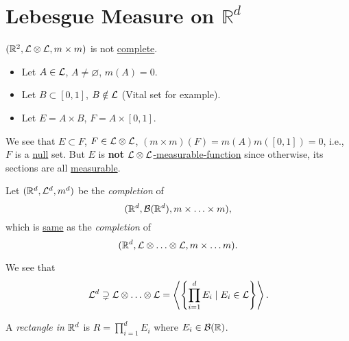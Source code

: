 \section{Lebesgue Measure on \(\mathbb{R} ^d\)}
\begin{eg}
	\((\mathbb{\MakeUppercase{r}} ^{2} , \mathcal{\MakeUppercase{l}} \otimes \mathcal{\MakeUppercase{l}}, m\times m)\) is not
	\hyperref[def:complete-measure-space]{complete}.
\end{eg}
\begin{explanation}
	\begin{itemize}
		\item Let \(A\in \mathcal{\MakeUppercase{l}} \), \(A\neq \varnothing \), \(m(A) = 0\).
		\item Let \(B\subset [0, 1]\), \(B \notin \mathcal{\MakeUppercase{l}} \) (Vital set for example).
		\item Let \(E = A\times B\), \(F = A \times [0, 1]\).
	\end{itemize}
	We see that \(E\subset F\), \(F \in \mathcal{\MakeUppercase{l}} \otimes \mathcal{\MakeUppercase{l}} \), \((m\times m)(F)=m(A)m([0, 1]) = 0\), i.e.,
	\(F\) is a \hyperref[def:mu-null-set]{null} set. But \(E\) is \textbf{not}
	\hyperref[def:A-measurable-function]{\(\mathcal{\MakeUppercase{l}} \otimes \mathcal{\MakeUppercase{l}} \)-measurable-function} since otherwise,
	its sections are all \hyperref[def:A-measurable-function]{measurable}.
\end{explanation}
\begin{definition}
	Let \((\mathbb{\MakeUppercase{r}} ^d, \mathcal{\MakeUppercase{l}} ^d, m^d)\) be the \emph{completion} of
	\[
		(\mathbb{\MakeUppercase{r}} ^d, \mathcal{\MakeUppercase{b}} (\mathbb{\MakeUppercase{r}} ^d), m\times \ldots \times m ),
	\]
	which is \underline{same} as the \emph{completion} of
	\[
		(\mathbb{\MakeUppercase{r}} ^d, \mathcal{\MakeUppercase{l}} \otimes \ldots \otimes \mathcal{\MakeUppercase{l}}, m\times \ldots m).
	\]
\end{definition}

\begin{remark}
	We see that
	\[
		\mathcal{\MakeUppercase{l}} ^d \supsetneq \mathcal{\MakeUppercase{l}} \otimes \ldots \otimes \mathcal{\MakeUppercase{l}}
		= \left< \left\{ \prod\limits_{i=1}^{d}E_{i} \mid E_{i} \in \mathcal{\MakeUppercase{l}}  \right\} \right>.
	\]
\end{remark}

\begin{definition}\label{def:rectangle-in-Rd}
	A \emph{rectangle in \(\mathbb{\MakeUppercase{r}} ^d\)} is \(R = \prod\limits_{i=1}^{d} E_{i} \) where \(E_{i}\in \mathcal{\MakeUppercase{b}} (\mathbb{\MakeUppercase{r}} )\).
\end{definition}

